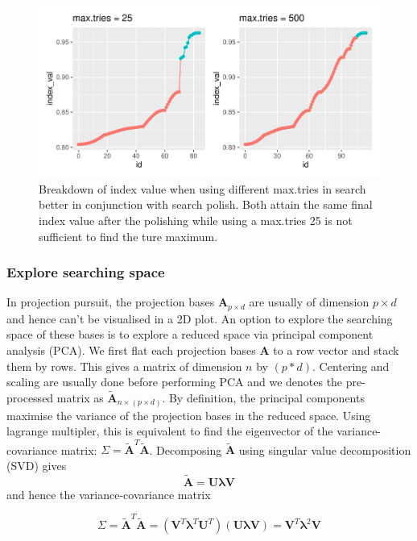 \documentclass[12pt]{article}
\begin{document}
\begin{figure}
\centering
\includegraphics{paper_files/figure-latex/polish-1.pdf}
\caption{\label{trace-compare}Breakdown of index value when using
different max.tries in search better in conjunction with search polish.
Both attain the same final index value after the polishing while using a
max.tries 25 is not sufficient to find the ture maximum.}
\end{figure}

\newpage

\hypertarget{animated}{%
\subsubsection{Explore searching space}\label{animated}}

In projection pursuit, the projection bases \(\mathbf{A}_{p \times d}\)
are usually of dimension \(p \times d\) and hence can't be visualised in
a 2D plot. An option to explore the searching space of these bases is to
explore a reduced space via principal component analysis (PCA). We first
flat each projection bases \(\mathbf{A}\) to a row vector and stack them
by rows. This gives a matrix of dimension \(n\) by \((p*d)\). Centering
and scaling are usually done before performing PCA and we denotes the
pre-processed matrix as \(\tilde{\mathbf{A}}_{n \times (p \times d)}\).
By definition, the principal components maximise the variance of the
projection bases in the reduced space. Using lagrange multipler, this is
equivalent to find the eigenvector of the variance-covariance matrix:
\(\Sigma = \tilde{\mathbf{A}}^T\tilde{\mathbf{A}}\). Decomposing
\(\tilde{\mathbf{A}}\) using singular value decomposition (SVD) gives
\[\tilde{\mathbf{A}} = \mathbf{U} \mathbf{\lambda} \mathbf{V}\] and
hence the variance-covariance matrix

\[\Sigma = \tilde{\mathbf{A}}^T\tilde{\mathbf{A}} = (\mathbf{V}^T \mathbf{\lambda}^T \mathbf{U}^T) (\mathbf{U} \mathbf{\lambda} \mathbf{V}) = \mathbf{V}^T \mathbf{\lambda}^2 \mathbf{V}\]
\end{document}
